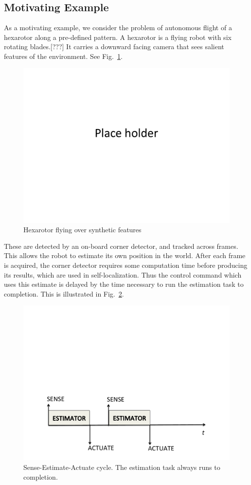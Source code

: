 \subsection{Motivating Example}
\label{motivatingExample}

As a motivating example, we consider the problem of autonomous flight of a hexarotor along a pre-defined pattern.
A hexarotor is a flying robot with six rotating blades.[???]
It carries a downward facing camera that sees salient features of the environment. 
See Fig.~\ref{fig:hexarotor}.
\begin{figure}[t]
	\centering
	\includegraphics[width=0.7\linewidth]{figures/placeHolder}
	\caption{Hexarotor flying over synthetic features}
	\label{fig:hexarotor}
\end{figure}
These are detected by an on-board corner detector, and tracked across frames.
This allows the robot to estimate its own position in the world.
After each frame is acquired, the corner detector requires some computation time before producing its results, which are used in self-localization.
Thus the control command which uses this estimate is delayed by the time necessary to run the estimation task to completion.
This is illustrated in Fig.~\ref{fig:senseActuate}.
\begin{figure}[t]
	\centering
	\includegraphics[width=0.7\linewidth]{figures/senseActuate}
	\caption{Sense-Estimate-Actuate cycle. The estimation task always runs to completion.}
	\label{fig:senseActuate}
\end{figure}
